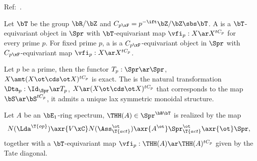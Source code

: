 \documentclass[article, a4paper, twoside]{universal}
\begin{document}
\confighead{}{}{}

Ref:~\cite{NS2018}.


\begin{dfn}[{\cite[\Rnum{2}.1.1]{NS2018}}]
    Let $\bT$ be the group $\bR/\bZ$ and $C_{p\xF}=p^{-\ift}\bZ/\bZ\sbs\bT$. A  is a $\bT$-equivariant object in $\Spr$ with $\bT$-equivariant map $\vfi_{p}:X\ar X^{tC_{p}}$ for every prime $p$. For fixed prime $p$, a  is a $C_{p\xF}$-equivariant object in $\Spr$ with $C_{p\xF}$-equivariant map $\vfi_{p}:X\ar X^{tC_{p}}$.
\end{dfn}

\begin{thm}
    Let $p$ be a prime, then the functor $T_{p}:\Spr\ar\Spr$, $X\amt (X\ot\cds\ot X)^{tC_{p}}$ is exact. The  is the natural transformation $\Dta_{p}:\Id_{\Spr}\ar T_{p}$, $X\ar(X\ot\cds\ot X)^{tC_{p}}$ that corresponds to the map $\bS\ar\bS^{tC_{p}}$, it admits a unique lax symmetric monoidal structure.
\end{thm}

\begin{dfn}[{\cite[B.5, \Rnum{3}.2.3]{NS2018}}]
    Let $A$ be an $\bE_{1}$-ring spectrum, $\THH(A)\in\Spr^{\bB\bT}$ is realized by the map
    \[
        N(\Lda^{\T{op}})\axr{V\xC}N(\Ass_{\T{act}}^{\ot})\axr{A^{\ot}}\Spr_{\T{act}}^{\ot}\axr{\ot}\Spr,
    \]
    together with a $\bT$-equivariant map $\vfi_{p}:\THH(A)\ar\THH(A)^{tC_{p}}$ given by the Tate diagonal.
\end{dfn}


\printref
\end{document}
